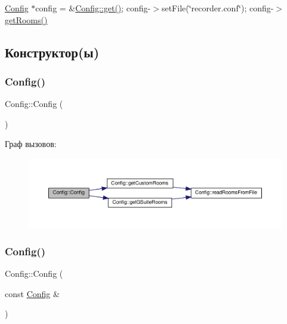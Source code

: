 \hyperlink{class_config}{Config} $\ast$config = \&\hyperlink{class_config_a5154d96acc76c1fae8c564f3705fe197}{Config\+::get()}; config-\/$>$set\+File(\char`\"{}recorder.\+conf\char`\"{}); config-\/$>$\hyperlink{class_config_a644ff01239e20fabb038a2b2eddf1a26}{get\+Rooms()} 

\subsection{Конструктор(ы)}
\mbox{\label{class_config_abd0c571c116924871e30444b192b792a}} 
\subsubsection{\texorpdfstring{Config()}{Config()}\hspace{0.1cm}{\footnotesize\ttfamily [1/4]}}
{\footnotesize\ttfamily Config\+::\+Config (\begin{DoxyParamCaption}{ }\end{DoxyParamCaption})\hspace{0.3cm}{\ttfamily [private]}}

Граф вызовов\+:\nopagebreak
\begin{figure}[H]
\begin{center}
\leavevmode
\includegraphics[width=350pt]{class_config_abd0c571c116924871e30444b192b792a_cgraph}
\end{center}
\end{figure}
\mbox{\label{class_config_add59e40b81cf0ffb43571bc201781dc0}} 
\subsubsection{\texorpdfstring{Config()}{Config()}\hspace{0.1cm}{\footnotesize\ttfamily [2/4]}}
{\footnotesize\ttfamily Config\+::\+Config (\begin{DoxyParamCaption}\item[{const \hyperlink{class_config}{Config} \&}]{ }\end{DoxyParamCaption})\hspace{0.3cm}{\ttfamily [private]}}

